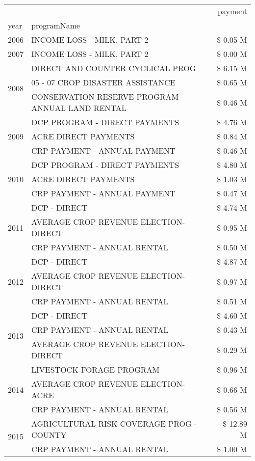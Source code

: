 \begin{tabular}{llr}
\toprule
 &  & payment \\
year & programName &  \\
\midrule
2006 & INCOME LOSS - MILK, PART 2 & \$ 0.05 M \\
\cline{1-3}
2007 & INCOME LOSS - MILK, PART 2 & \$ 0.00 M \\
\cline{1-3}
\multirow[t]{3}{*}{2008} & DIRECT AND COUNTER CYCLICAL PROG & \$ 6.15 M \\
 & 05 - 07 CROP DISASTER ASSISTANCE & \$ 0.65 M \\
 & CONSERVATION RESERVE PROGRAM - ANNUAL LAND RENTAL & \$ 0.46 M \\
\cline{1-3}
\multirow[t]{3}{*}{2009} & DCP PROGRAM - DIRECT PAYMENTS & \$ 4.76 M \\
 & ACRE DIRECT PAYMENTS & \$ 0.84 M \\
 & CRP PAYMENT - ANNUAL PAYMENT & \$ 0.46 M \\
\cline{1-3}
\multirow[t]{3}{*}{2010} & DCP PROGRAM - DIRECT PAYMENTS & \$ 4.80 M \\
 & ACRE DIRECT PAYMENTS & \$ 1.03 M \\
 & CRP PAYMENT - ANNUAL PAYMENT & \$ 0.47 M \\
\cline{1-3}
\multirow[t]{3}{*}{2011} & DCP - DIRECT & \$ 4.74 M \\
 & AVERAGE CROP REVENUE ELECTION-DIRECT & \$ 0.95 M \\
 & CRP PAYMENT - ANNUAL RENTAL & \$ 0.50 M \\
\cline{1-3}
\multirow[t]{3}{*}{2012} & DCP - DIRECT & \$ 4.87 M \\
 & AVERAGE CROP REVENUE ELECTION-DIRECT & \$ 0.97 M \\
 & CRP PAYMENT - ANNUAL RENTAL & \$ 0.51 M \\
\cline{1-3}
\multirow[t]{3}{*}{2013} & DCP - DIRECT & \$ 4.60 M \\
 & CRP PAYMENT - ANNUAL RENTAL & \$ 0.43 M \\
 & AVERAGE CROP REVENUE ELECTION-DIRECT & \$ 0.29 M \\
\cline{1-3}
\multirow[t]{3}{*}{2014} & LIVESTOCK FORAGE PROGRAM & \$ 0.96 M \\
 & AVERAGE CROP REVENUE ELECTION-ACRE & \$ 0.66 M \\
 & CRP PAYMENT - ANNUAL RENTAL & \$ 0.56 M \\
\cline{1-3}
\multirow[t]{3}{*}{2015} & AGRICULTURAL RISK COVERAGE PROG - COUNTY & \$ 12.89 M \\
 & CRP PAYMENT - ANNUAL RENTAL & \$ 1.00 M \\

\end{tabular}
